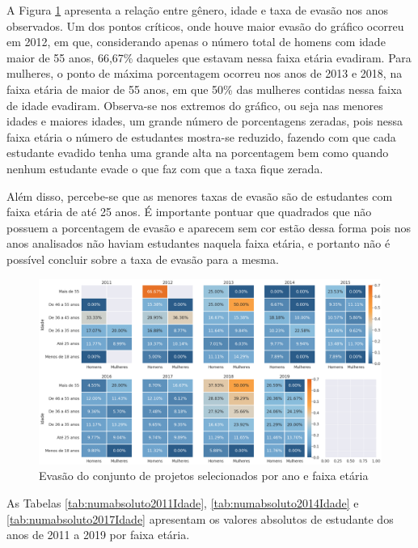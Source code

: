A Figura \ref{fig:calorIdade} apresenta a relação entre gênero, idade e taxa de evasão nos anos observados. Um dos pontos críticos, onde houve maior evasão do gráfico ocorreu em 2012, em que, considerando apenas o número total de homens com idade maior de 55 anos, 66,67\% daqueles que estavam nessa faixa etária evadiram. Para mulheres, o ponto de máxima porcentagem ocorreu nos anos de 2013 e 2018, na faixa etária de maior de 55 anos, em que 50\% das mulheres contidas nessa faixa de idade evadiram. Observa-se nos extremos do gráfico, ou seja nas menores idades e maiores idades, um grande número de porcentagens zeradas, pois nessa faixa etária o número de estudantes mostra-se reduzido, fazendo com que cada estudante evadido tenha uma grande alta na porcentagem bem como quando nenhum estudante evade o que faz com que a taxa fique zerada.

Além disso, percebe-se que as menores taxas de evasão são de estudantes com faixa etária de até 25 anos. É importante pontuar que quadrados que não possuem a porcentagem de evasão e aparecem sem cor estão dessa forma pois nos anos analisados não haviam estudantes naquela faixa etária, e portanto não é possível concluir sobre a taxa de evasão para a mesma. 


\begin{figure}[H]
\centering
\includegraphics[width=1\textwidth]{Figuras/calorIdade.png}
\caption{Evasão do conjunto de projetos selecionados por ano e faixa etária}
\label{fig:calorIdade}
\end{figure}

As Tabelas \ref{tab:numabsoluto2011Idade}, \ref{tab:numabsoluto2014Idade} e \ref{tab:numabsoluto2017Idade} apresentam os valores absolutos de estudante dos anos de 2011 a 2019 por faixa etária.

